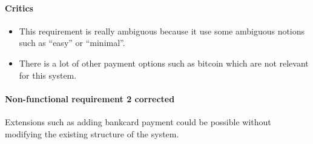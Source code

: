 \begin{framed}
    \paragraph{Critics}
    \begin{itemize}
        \item This requirement is really ambiguous because it use some
            ambiguous notions such as \enquote{easy} or \enquote{minimal}.

        \item There is a lot of other payment options such as bitcoin
            which are not relevant for this system.
    \end{itemize}
\paragraph{Non-functional requirement 2 corrected} Extensions such as adding
bankcard payment could be possible without modifying the existing structure of
the system.
\end{framed}
